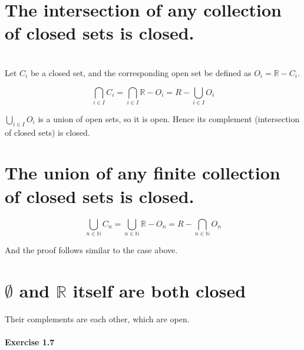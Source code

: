 \begin{parts}
 
 \part{The intersection of any collection of closed sets is closed.}
 
 
\begin{solution}
 \\Let $C_i$ be a closed set, and the corresponding open set be defined as $O_i = \mathbb{R} - C_i$.
 
 $$\bigcap_{i \in I} C_i = \bigcap_{i \in I} \mathbb{R} - O_i = R - \bigcup_{i \in I} O_i$$
 
 $\bigcup_{i\in I}O_i$ is a union of open sets, so it is open. Hence its complement (intersection of closed sets) is closed.
\end{solution}

\part{The union of any finite collection of closed sets is closed.}

\begin{solution}
 
 $$\bigcup_{n \in \mathbb{N}} C_n =  \bigcup_{n \in \mathbb{N}} \mathbb{R} - O_n = R - \bigcap_{n \in \mathbb{N}} O_n$$
 
 And the proof follows similar to the case above.
\end{solution}

\part{$\emptyset$ and $\mathbb{R}$ itself are both closed}

\begin{solution}
 Their complements are each other, which are open.
\end{solution}
\end{parts}

\subsection{Exercise 1.7}


